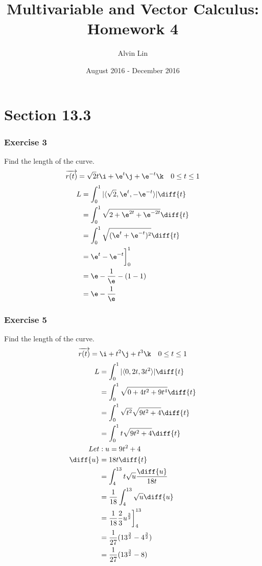 \documentclass[letterpaper, 12pt]{math}
\title{Multivariable and Vector Calculus: Homework 4}
\author{Alvin Lin}
\date{August 2016 - December 2016}
\begin{document}
\maketitle

\section*{Section 13.3}

\subsubsection*{Exercise 3}
Find the length of the curve.
\[ \overrightarrow{r(t)} = \sqrt{2}t\i+\e^t\j+\e^{-t}\k \quad 0\le t\le 1 \]
\begin{align*}
  L &= \int_{0}^{1}|\langle\sqrt{2},\e^t,-\e^{-t}\rangle|\diff{t} \\
  &= \int_{0}^{1}\sqrt{2+\e^{2t}+\e^{-2t}}\diff{t} \\
  &= \int_{0}^{1}\sqrt{(\e^t+\e^{-t})^2}\diff{t} \\
  &= \e^t-\e^{-t}\bigg]_{0}^{1} \\
  &= \e-\frac{1}{\e}-(1-1) \\
  &= \e-\frac{1}{\e}
\end{align*}

\subsubsection*{Exercise 5}
Find the length of the curve.
\[ \overrightarrow{r(t)} = \i+t^2\j+t^3\k \quad 0\le t\le 1 \]
\begin{align*}
  L &= \int_{0}^{1}|\langle0,2t,3t^2\rangle|\diff{t} \\
  &= \int_{0}^{1}\sqrt{0+4t^2+9t^4}\diff{t} \\
  &= \int_{0}^{1}\sqrt{t^2}\sqrt{9t^2+4}\diff{t} \\
  &= \int_{0}^{1}t\sqrt{9t^2+4}\diff{t} \\
  Let &: u = 9t^2+4 \\
  \diff{u} &= 18t\diff{t} \\
  &= \int_{4}^{13}t\sqrt{u}\frac{\diff{u}}{18t} \\
  &= \frac{1}{18}\int_{4}^{13}\sqrt{u}\diff{u} \\
  &= \frac{1}{18}\frac{2}{3}u^{\frac{3}{2}}\bigg]_{4}^{13} \\
  &= \frac{1}{27}(13^{\frac{3}{2}}-4^{\frac{3}{2}}) \\
  &= \frac{1}{27}(13^{\frac{3}{2}}-8)
\end{align*}
\end{document}
